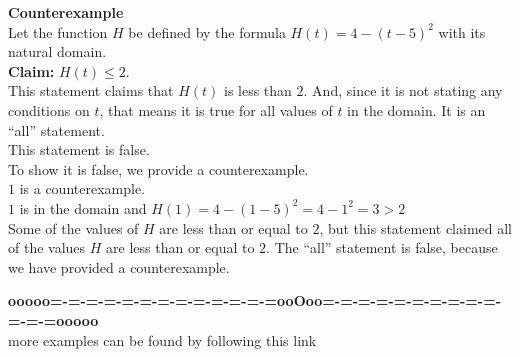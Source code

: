 \documentclass{ximera}
\begin{document}
\begin{example}    \textbf{\textcolor{blue!55!black}{Counterexample}} \\



Let the function $H$ be defined by the formula $H(t) = 4 - (t-5)^2$ with its natural domain. \\

\textbf{\textcolor{blue!55!black}{Claim:}} $H(t) \leq 2$.  \\



This statement claims that $H(t)$ is less than $2$.  And, since it is not stating any conditions on $t$, that means it is true for all values of $t$ in the domain.  It is an ``all'' statement. \\

This statement is false. \\

To show it is false, we provide a counterexample. \\ 


$1$ is a counterexample. \\


$1$ is in the domain and  $H(1) = 4 - (1-5)^2 = 4 - 1^2 = 3 > 2$ \\



Some of the values of $H$ are less than or equal to $2$, but this statement claimed all of the values $H$ are less than or equal to $2$.  The ``all'' statement is false, because we have provided a counterexample.



\end{example}










\begin{center}
\textbf{\textcolor{green!50!black}{ooooo=-=-=-=-=-=-=-=-=-=-=-=-=ooOoo=-=-=-=-=-=-=-=-=-=-=-=-=ooooo}} \\

more examples can be found by following this link\\ 

\end{center}
\end{document}
